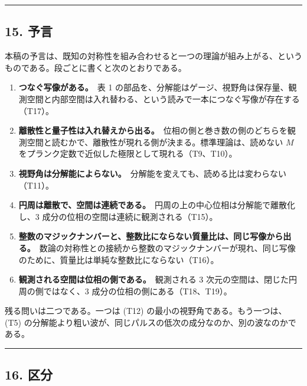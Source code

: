 \documentclass[
  a4paper,
]{ltjsarticle}
\providecommand{\tightlist}{%
  \setlength{\itemsep}{0pt}\setlength{\parskip}{0pt}}
\begin{document}
\begin{center}\rule{0.5\linewidth}{0.5pt}\end{center}

\subsection{15. 予言}\label{ux4e88ux8a00}

本稿の予言は、既知の対称性を組み合わせると一つの理論が組み上がる、というものである。段ごとに書くと次のとおりである。

\begin{enumerate}
\def\labelenumi{\arabic{enumi}.}
\tightlist
\item
  \textbf{つなぐ写像がある。}　表 1
  の部品を、分解能はゲージ、視野角は保存量、観測空間と内部空間は入れ替わる、という読みで一本につなぐ写像が存在する（T17）。
\item
  \textbf{離散性と量子性は入れ替えから出る。}　位相の側と巻き数の側のどちらを観測空間と読むかで、離散性が現れる側が決まる。標準理論は、読めない
  \(M\) をプランク定数で近似した極限として現れる（T9、T10）。
\item
  \textbf{視野角は分解能によらない。}　分解能を変えても、読める比は変わらない（T11）。
\item
  \textbf{円周は離散で、空間は連続である。}　円周の上の中心位相は分解能で離散化し、3
  成分の位相の空間は連続に観測される（T15）。
\item
  \textbf{整数のマジックナンバーと、整数比にならない質量比は、同じ写像から出る。}　数論の対称性との接続から整数のマジックナンバーが現れ、同じ写像のために、質量比は単純な整数比にならない（T16）。
\item
  \textbf{観測される空間は位相の側である。}　観測される 3
  次元の空間は、閉じた円周の側ではなく、3
  成分の位相の側にある（T18、T19）。
\end{enumerate}

残る問いは二つである。一つは (T12)
の最小の視野角である。もう一つは、(T5)
の分解能より粗い波が、同じパルスの低次の成分なのか、別の波なのかである。

\begin{center}\rule{0.5\linewidth}{0.5pt}\end{center}

\subsection{16. 区分}\label{ux533aux5206}
\end{document}
